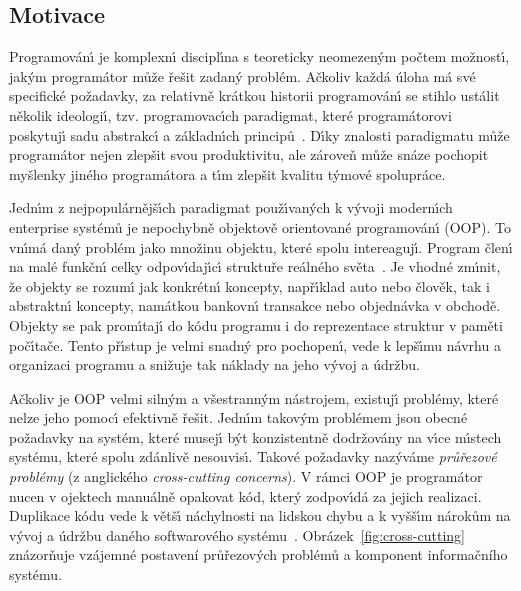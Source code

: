 \subsection{Motivace}

Programován\'{\i} je komplexn\'{\i} discipl\'{\i}na s teoreticky
neomezen\'ym počtem možnost\'{\i}, jak\'ym programátor může
řešit zadan\'y problém. Ačkoliv každá úloha má své specifické
požadavky, za relativně krátkou historii programován\'{\i} se
stihlo ustálit několik ideologi\'{\i}, tzv. programovac\'{\i}ch
paradigmat, které programátorovi poskytuj\'{\i} sadu abstrakc\'{\i}
a základn\'{\i}ch principů~\cite{van2009programming}.
D\'{\i}ky znalosti paradigmatu může programátor nejen zlepšit
svou produktivitu, ale zároveň může snáze pochopit myšlenky
jiného programátora a t\'{\i}m zlepšit kvalitu t\'ymové spolupráce.

Jedn\'{\i}m z nejpopulárnějš\'{\i}ch paradigmat použ\'{\i}van\'ych k
v\'yvoji modern\'{\i}ch enterprise systémů je nepochybně
objektově orientované programován\'{\i} (\gls{OOP}). To vn\'{\i}má dan\'y problém
jako množinu objektu, které spolu intereaguj\'{\i}. Program
člen\'{\i} na malé funkčn\'{\i} celky odpov\'{\i}daj\'{\i}c\'{\i} struktuře
reálného světa~\cite{rentsch1982object}. Je vhodné zm\'{\i}nit,
že objekty se rozum\'{\i} jak konkrétn\'{\i} koncepty, např\'{\i}klad
auto nebo člověk, tak i abstraktn\'{\i} koncepty,
namátkou bankovn\'{\i} transakce nebo objednávka v obchodě.
Objekty se pak prom\'{\i}taj\'{\i} do kódu programu i do
reprezentace struktur v paměti poč\'{\i}tače.
Tento př\'{\i}stup je velmi snadn\'y pro pochopen\'{\i},
vede k lepš\'{\i}mu návrhu a organizaci programu a snižuje
tak náklady na jeho v\'yvoj a údržbu.

Ačkoliv je \gls{OOP} velmi siln\'ym a všestrann\'ym nástrojem,
existuj\'{\i} problémy, které nelze jeho pomoc\'{\i} efektivně řešit.
Jedn\'{\i}m takov\'ym problémem jsou obecné požadavky na systém,
které musej\'{\i} b\'yt konzistentně dodržovány na v\'{\i}ce
m\'{\i}stech systému, které spolu zdánlivě nesouvis\'{\i}.
Takové požadavky naz\'yváme \textit{průřezové problémy}
(z anglického \textit{cross-cutting concerns}).
V rámci \gls{OOP} je programátor nucen v ojektech manuálně opakovat
kód, kter\'y zodpov\'{\i}dá za jejich realizaci. Duplikace kódu
vede k větš\'{\i} náchylnosti na lidskou chybu a k vyšš\'{\i}m nárokům na v\'yvoj
a údržbu daného softwarového systému~\cite{fowler1999refactoring}.
Obrázek~\ref{fig:cross-cutting} znázorňuje vzájemné postavení průřezových
problémů a komponent informačního systému.

